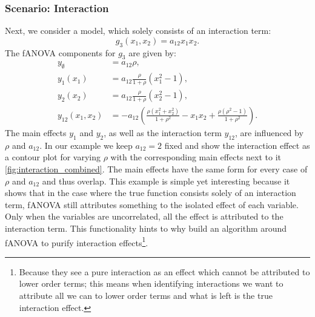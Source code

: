 \subsubsection{Scenario: Interaction}
Next, we consider a model, which solely consists of an interaction term:
$$g_3(x_1, x_2) = a_{12} x_1 x_2.$$
The fANOVA components for $g_3$ are given by:
\begin{align*}
    y_{\emptyset} &= a_{12} \rho, \\
    y_{1}(x_1) &= a_{12} \frac{\rho}{1+ \rho} (x_1^2 - 1), \\
    y_{2}(x_2) &= a_{12} \frac{\rho}{1+ \rho} (x_2^2 - 1), \\
    y_{12}(x_1,x_2) 
&= -a_{12}\!\left(
    \frac{\rho(x_1^2+x_2^2)}{1+\rho^2} 
    - x_1 x_2 
    + \frac{\rho(\rho^2-1)}{1+\rho^2}
   \right).
\end{align*}
The main effects $y_1$ and $y_2$, as well as the interaction term $y_{12}$, are influenced by $\rho$ and $a_{12}$.
In our example we keep $a_{12} = 2$ fixed and show the interaction effect as a contour plot for varying $\rho$ with the corresponding main effects next to it \autoref{fig:interaction_combined}.
The main effects have the same form for every case of $\rho$ and $a_{12}$ and thus overlap. This example is simple yet interesting because it shows that in the case where the true function consists solely of an interaction term, fANOVA still attributes something to the isolated effect of each variable. Only when the variables are uncorrelated, all the effect is attributed to the interaction term. This functionality hints to why \cite{lengerich2020} build an algorithm around fANOVA to purify interaction effects\footnote{Because they see a pure interaction as an effect which cannot be attributed to lower order terms; this means when identifying interactions we want to attribute all we can to lower order terms and what is left is the true interaction effect.}.


